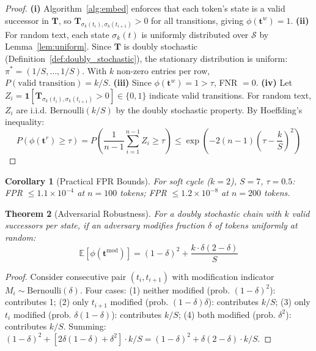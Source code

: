 \documentclass[11pt]{article}
\newtheorem{theorem}{Theorem}[section]
\newtheorem{corollary}[theorem]{Corollary}
\theoremstyle{definition}
\theoremstyle{remark}
\begin{document}
\begin{proof}
\textbf{(i)} Algorithm~\ref{alg:embed} enforces that each token's state is a valid successor in $\mathbf{T}$, so $\mathbf{T}_{\sigma_k(t_i), \sigma_k(t_{i+1})} > 0$ for all transitions, giving $\phi(\mathbf{t}^w) = 1$.
\textbf{(ii)} For random text, each state $\sigma_k(t)$ is uniformly distributed over $\mathcal{S}$ by Lemma~\ref{lem:uniform}. Since $\mathbf{T}$ is doubly stochastic (Definition~\ref{def:doubly_stochastic}), the stationary distribution is uniform: $\pi^* = (1/S, \ldots, 1/S)$. With $k$ non-zero entries per row, $P(\text{valid transition}) = k/S$.
\textbf{(iii)} Since $\phi(\mathbf{t}^w) = 1 > \tau$, FNR $= 0$.
\textbf{(iv)} Let $Z_i = \mathbf{1}[\mathbf{T}_{\sigma_k(t_i), \sigma_k(t_{i+1})} > 0] \in \{0,1\}$ indicate valid transitions. For random text, $Z_i$ are i.i.d. Bernoulli$(k/S)$ by the doubly stochastic property. By Hoeffding's inequality:
$$P\left(\phi(\mathbf{t}^r) \geq \tau\right) = P\left(\frac{1}{n-1}\sum_{i=1}^{n-1} Z_i \geq \tau\right) \leq \exp\left(-2(n-1)\left(\tau - \frac{k}{S}\right)^2\right)$$
\end{proof}

\begin{corollary}[Practical FPR Bounds]
For soft cycle ($k{=}2$), $S=7$, $\tau=0.5$: FPR $\leq 1.1 \times 10^{-4}$ at $n=100$ tokens; FPR $\leq 1.2 \times 10^{-8}$ at $n=200$ tokens.
\end{corollary}

\begin{theorem}[Adversarial Robustness]
\label{thm:robustness}
For a doubly stochastic chain with $k$ valid successors per state, if an adversary modifies fraction $\delta$ of tokens uniformly at random:
$$\mathbb{E}[\phi(\mathbf{t}^{\text{mod}})] = (1-\delta)^2 + \frac{k \cdot \delta(2-\delta)}{S}$$
\end{theorem}

\begin{proof}
Consider consecutive pair $(t_i, t_{i+1})$ with modification indicator $M_i \sim \text{Bernoulli}(\delta)$. Four cases: (1) neither modified (prob. $(1{-}\delta)^2$): contributes 1; (2) only $t_{i+1}$ modified (prob. $(1{-}\delta)\delta$): contributes $k/S$; (3) only $t_i$ modified (prob. $\delta(1{-}\delta)$): contributes $k/S$; (4) both modified (prob. $\delta^2$): contributes $k/S$. Summing: $(1{-}\delta)^2 + [2\delta(1{-}\delta) + \delta^2] \cdot k/S = (1{-}\delta)^2 + \delta(2{-}\delta) \cdot k/S$.
\end{proof}
\end{document}
